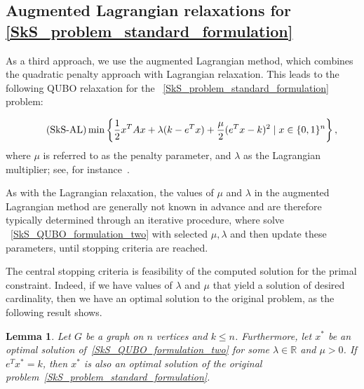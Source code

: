 \documentclass{article}
\newtheorem{lem}[thm]{Lemma}
\begin{document}
\subsection{Augmented Lagrangian relaxations for \ref{SkS_problem_standard_formulation}}
\label{augmented_lagrangian_SkS}


As a third approach, we use the augmented Lagrangian method, which combines the quadratic penalty approach with Lagrangian relaxation. This leads to the following QUBO relaxation for the ~\eqref{SkS_problem_standard_formulation} problem:

\begin{align}\label{SkS_QUBO_formulation_two}
\tag{\mbox{SkS-AL}}
     \min \left\{\frac{1}{2}x^TAx + \lambda(k - e^Tx) + \frac{\mu}{2}(e^Tx - k)^2 
     \mid x \in \{0, 1\}^n \right\},
\end{align}
where $\mu$ is referred to as the penalty parameter, and $\lambda$ as the Lagrangian multiplier; see, for instance~\cite{Bertsekas}.

As with the Lagrangian relaxation, the values of $\mu$ and $\lambda$ in the augmented Lagrangian method are generally not known in advance and are therefore typically determined through an iterative procedure, where  solve ~\eqref{SkS_QUBO_formulation_two} with
selected  $\mu,\lambda$ and then update these parameters, until stopping criteria are reached. 

The central stopping criteria is feasibility of the computed solution for the primal constraint. Indeed,  if we have values of $\lambda$ and $\mu$ that yield a solution of desired cardinality, then we have  an optimal solution to the original problem, as the following result shows.\\
\begin{lem}\label{lem:optimality_test_ALM}
Let $G$ be a graph on $n$ vertices and $k \leq n$. Furthermore, let $x^*$ be an optimal solution of~\eqref{SkS_QUBO_formulation_two} for some $\lambda \in \mathbb{R}$ and $\mu > 0$. If $e^T x^* = k$, then $x^*$ is also an optimal solution of the original  problem~\eqref{SkS_problem_standard_formulation}.
\end{lem}
\end{document}

